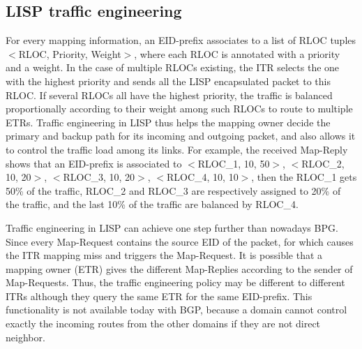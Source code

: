 \subsection{LISP traffic engineering}
\label{subsubsec:te}
For every mapping information, an EID-prefix associates to a list of RLOC tuples $<$RLOC, Priority, Weight$>$, where each RLOC is annotated with a priority and a weight. In the case of multiple RLOCs existing, the ITR selects the one with the highest priority and sends all the LISP encapsulated packet to this RLOC. If several RLOCs all have the highest priority, the traffic is balanced proportionally according to their weight among such RLOCs to route to multiple ETRs. Traffic engineering in LISP thus helps the mapping owner decide the primary and backup path for its incoming and outgoing packet, and also allows it to control the traffic load among its links. For example, the received Map-Reply shows that an EID-prefix is associated to $<$RLOC\_1, 10, 50$>$, $<$RLOC\_2, 10, 20$>$, $<$RLOC\_3, 10, 20$>$, $<$RLOC\_4, 10, 10$>$, then the RLOC\_1 gets 50\% of the traffic, RLOC\_2 and RLOC\_3 are respectively assigned to 20\% of the traffic, and the last 10\% of the traffic are balanced by RLOC\_4.  %

Traffic engineering in LISP can achieve one step further than nowadays BPG. Since every Map-Request contains the source EID of the packet, for which causes the ITR mapping miss and triggers the Map-Request. It is possible that a mapping owner (ETR) gives the different Map-Replies according to the sender of Map-Requests. Thus, the traffic engineering policy may be different to different ITRs although they query the same ETR for the same EID-prefix. This functionality is not available today with BGP, because a domain cannot control exactly the incoming routes from the other domains if they are not direct neighbor.


